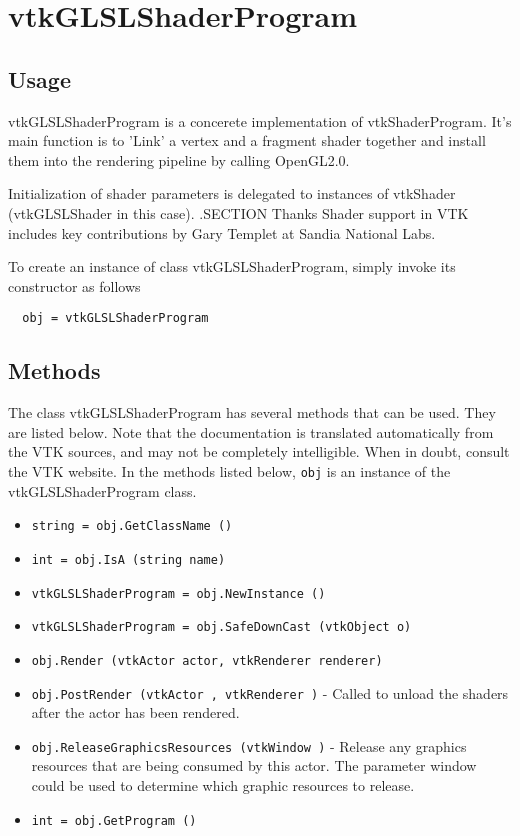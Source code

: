 \section{vtkGLSLShaderProgram}

\subsection{Usage}

 vtkGLSLShaderProgram is a concerete implementation of vtkShaderProgram.
 It's main function is to 'Link' a vertex and a fragment shader together
 and install them into the rendering pipeline by calling OpenGL2.0.

 Initialization of shader parameters is delegated to instances of vtkShader
 (vtkGLSLShader in this case).
 .SECTION Thanks
 Shader support in VTK includes key contributions by Gary Templet at 
 Sandia National Labs.

To create an instance of class vtkGLSLShaderProgram, simply
invoke its constructor as follows
\begin{verbatim}
  obj = vtkGLSLShaderProgram
\end{verbatim}
\subsection{Methods}

The class vtkGLSLShaderProgram has several methods that can be used.
  They are listed below.
Note that the documentation is translated automatically from the VTK sources,
and may not be completely intelligible.  When in doubt, consult the VTK website.
In the methods listed below, \verb|obj| is an instance of the vtkGLSLShaderProgram class.
\begin{itemize}
\item  \verb|string = obj.GetClassName ()|

\item  \verb|int = obj.IsA (string name)|

\item  \verb|vtkGLSLShaderProgram = obj.NewInstance ()|

\item  \verb|vtkGLSLShaderProgram = obj.SafeDownCast (vtkObject o)|

\item  \verb|obj.Render (vtkActor actor, vtkRenderer renderer)|

\item  \verb|obj.PostRender (vtkActor , vtkRenderer )| -  Called to unload the shaders after the actor has been rendered.

\item  \verb|obj.ReleaseGraphicsResources (vtkWindow )| -  Release any graphics resources that are being consumed by this actor.
 The parameter window could be used to determine which graphic
 resources to release.

\item  \verb|int = obj.GetProgram ()|

\end{itemize}
